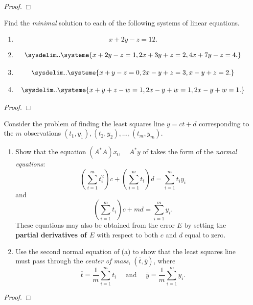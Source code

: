 \begin{proof}
\end{proof}

\begin{exercise} \label{exercise 6.3.22}
Find the \emph{minimal} solution to each of the following systems of linear equations.
\begin{enumerate}
\item
\[
    x + 2y - z = 12.
\]
\item
\[
    \sysdelim..\systeme{
        x + 2y - z = 1,
        2x + 3y + z = 2,
        4x + 7y - z = 4.
    }
\]
\item
\[
    \sysdelim..\systeme{
        x + y - z = 0,
        2x - y + z = 3,
        x - y + z = 2.
    }
\]
\item 
\[
    \sysdelim..\systeme{
        x + y + z - w =1,
        2x - y + w = 1,
        2x - y + w = 1.
    }
\]
\end{enumerate}
\end{exercise}

\begin{proof}
\end{proof}

\begin{exercise} \label{exercise 6.3.23}
Consider the problem of finding the least squares line \(y = ct + d\) corresponding to the \(m\) observations \((t_1, y_1), (t_2, y_2), ..., (t_m, y_m)\).
\begin{enumerate}
\item Show that the equation \((A^* A) x_0 = A^*y\) of  takes the form of the \emph{normal equations}:
\[
    \left( \sum_{i = 1}^m t_i^2 \right) c
    + \left( \sum_{i = 1}^m t_i \right) d
    = \sum_{i = 1}^m t_i y_i
\]
and
\[
    \left( \sum_{i = 1}^m t_i \right) c + md
    = \sum_{i = 1}^m y_i.
\]
These equations may also be obtained from the error \(E\) by setting the \textbf{partial derivatives of \(E\)} with respect to both \(c\) and \(d\) equal to zero.

\item
Use the second normal equation of (a) to show that the least squares line must pass through the \emph{center of mass}, \((\overline{t}, \overline{y})\), where
\[
    \overline{t} = \frac{1}{m} \sum_{i = 1}^m t_i
    \quad \text{ and } \quad
    \overline{y} = \frac{1}{m} \sum_{i = 1}^m y_i.
\]
\end{enumerate}
\end{exercise}

\begin{proof}
\end{proof}

